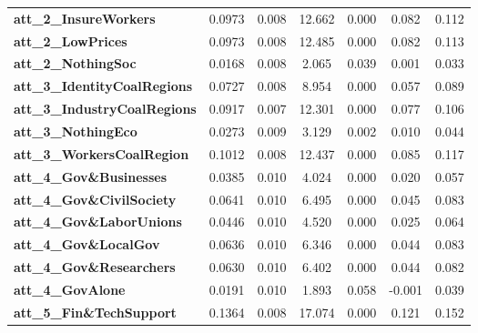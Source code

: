 \begin{center}
\begin{tabular}{lcccccc}
\textbf{att\_2\_InsureWorkers}       &       0.0973  &        0.008     &    12.662  &         0.000        &        0.082    &        0.112     \\
\textbf{att\_2\_LowPrices}           &       0.0973  &        0.008     &    12.485  &         0.000        &        0.082    &        0.113     \\
\textbf{att\_2\_NothingSoc}          &       0.0168  &        0.008     &     2.065  &         0.039        &        0.001    &        0.033     \\
\textbf{att\_3\_IdentityCoalRegions} &       0.0727  &        0.008     &     8.954  &         0.000        &        0.057    &        0.089     \\
\textbf{att\_3\_IndustryCoalRegions} &       0.0917  &        0.007     &    12.301  &         0.000        &        0.077    &        0.106     \\
\textbf{att\_3\_NothingEco}          &       0.0273  &        0.009     &     3.129  &         0.002        &        0.010    &        0.044     \\
\textbf{att\_3\_WorkersCoalRegion}   &       0.1012  &        0.008     &    12.437  &         0.000        &        0.085    &        0.117     \\
\textbf{att\_4\_Gov\&Businesses}     &       0.0385  &        0.010     &     4.024  &         0.000        &        0.020    &        0.057     \\
\textbf{att\_4\_Gov\&CivilSociety}   &       0.0641  &        0.010     &     6.495  &         0.000        &        0.045    &        0.083     \\
\textbf{att\_4\_Gov\&LaborUnions}    &       0.0446  &        0.010     &     4.520  &         0.000        &        0.025    &        0.064     \\
\textbf{att\_4\_Gov\&LocalGov}       &       0.0636  &        0.010     &     6.346  &         0.000        &        0.044    &        0.083     \\
\textbf{att\_4\_Gov\&Researchers}    &       0.0630  &        0.010     &     6.402  &         0.000        &        0.044    &        0.082     \\
\textbf{att\_4\_GovAlone}            &       0.0191  &        0.010     &     1.893  &         0.058        &       -0.001    &        0.039     \\
\textbf{att\_5\_Fin\&TechSupport}    &       0.1364  &        0.008     &    17.074  &         0.000        &        0.121    &        0.152     \\

\end{tabular}
\end{center}
